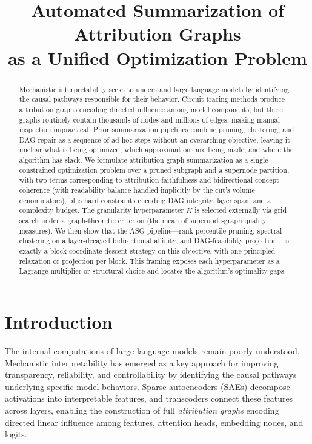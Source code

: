 \documentclass[table, 11pt]{article}
\title{Automated Summarization of Attribution Graphs \\
as a Unified Optimization Problem}
\author{}
\begin{document}
\maketitle

\begin{abstract}
Mechanistic interpretability seeks to understand large language models
by identifying the causal pathways responsible for their behavior.
Circuit tracing methods produce attribution graphs encoding directed
influence among model components, but these graphs routinely contain
thousands of nodes and millions of edges, making manual inspection
impractical. Prior summarization pipelines combine pruning,
clustering, and DAG repair as a sequence of ad-hoc steps without an
overarching objective, leaving it unclear what is being optimized,
which approximations are being made, and where the algorithm has
slack. We formulate attribution-graph summarization as a single
constrained optimization problem over a pruned subgraph and a
supernode partition, with two terms corresponding to attribution
faithfulness and bidirectional concept coherence (with readability
balance handled implicitly by the cut's volume denominators), plus
hard constraints encoding DAG integrity, layer span, and a
complexity budget. The granularity hyperparameter $K$ is selected
externally via grid search under a graph-theoretic criterion (the
mean of supernode-graph quality measures). We then show that the
ASG pipeline---rank-percentile pruning, spectral clustering on a
layer-decayed bidirectional affinity, and DAG-feasibility
projection---is exactly a block-coordinate descent strategy on this
objective, with one principled relaxation or projection per block.
This framing exposes each hyperparameter as a Lagrange multiplier or
structural choice and locates the algorithm's optimality gaps.
\end{abstract}

\section{Introduction}\label{sec:intro}

The internal computations of large language models remain poorly
understood. Mechanistic interpretability has emerged as a key
approach for improving transparency, reliability, and controllability
by identifying the causal pathways underlying specific model
behaviors. Sparse autoencoders (SAEs) decompose activations into
interpretable features, and transcoders connect these features across
layers, enabling the construction of full \emph{attribution graphs}
encoding directed linear influence among features, attention heads,
embedding nodes, and logits.
\end{document}

